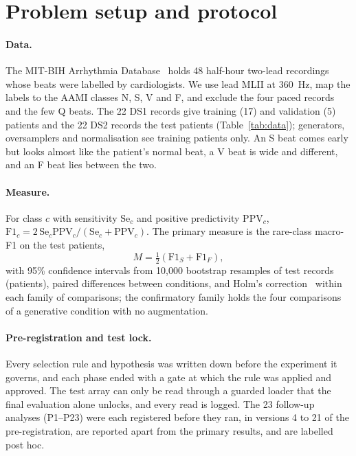 \documentclass[10pt,a4paper]{article}
\begin{document}
\section{Problem setup and protocol}\label{sec:protocol}
\paragraph{Data.} The MIT-BIH Arrhythmia Database~\cite{moody2001,goldberger2000} holds 48 half-hour two-lead recordings whose beats
were labelled by cardiologists. We use lead MLII at 360~Hz, map the labels to the AAMI classes N, S, V and F, and exclude the four
paced records and the few Q beats. The 22 DS1 records give training (17) and validation (5) patients and the 22 DS2 records the test
patients (Table~\ref{tab:data}); generators, oversamplers and normalisation see training patients only. An S beat
comes early but looks almost like the patient's normal beat, a V beat is wide and different, and an F beat lies between the two.

\begin{table}[htbp]\centering\small
\caption{Records and beats per split. S beats are under 4\% of each split, and F beats at most 1\%.}\label{tab:data}\end{table}

\paragraph{Measure.} For class $c$ with sensitivity $\mathrm{Se}_c$ and positive predictivity $\mathrm{PPV}_c$, $\mathrm{F1}_c =
2\,\mathrm{Se}_c\mathrm{PPV}_c/(\mathrm{Se}_c+\mathrm{PPV}_c)$. The primary measure is the rare-class macro-F1 on the test patients,
\begin{equation}
M = \tfrac{1}{2}\left(\mathrm{F1}_S + \mathrm{F1}_F\right),
\end{equation}
with 95\% confidence intervals from 10,000 bootstrap resamples of test records (patients), paired differences between conditions,
and Holm's correction~\cite{holm1979} within each family of comparisons; the confirmatory family holds the four comparisons of a
generative condition with no augmentation.

\paragraph{Pre-registration and test lock.} Every selection rule and hypothesis was written down before the experiment it governs, and
each phase ended with a gate at which the rule was applied and approved. The test array can only be read through a guarded loader
that the final evaluation alone unlocks, and every read is logged. The 23 follow-up analyses (P1--P23) were each registered before
they ran, in versions 4 to 21 of the pre-registration, are reported apart from the primary results, and are labelled post hoc.
\end{document}
